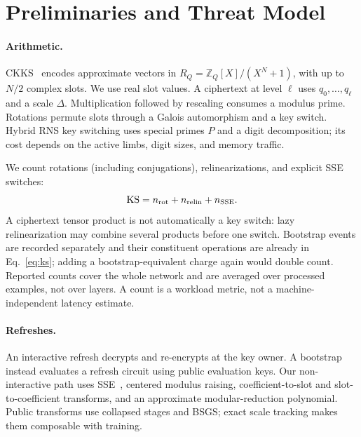 \section{Preliminaries and Threat Model}
\label{sec:prelim}
\paragraph{Arithmetic.}
CKKS~\cite{ckks2017} encodes approximate vectors in
$R_Q=\mathbb{Z}_Q[X]/(X^N+1)$, with up to $N/2$ complex slots. We use real slot values. A ciphertext at level $\ell$ uses $q_0,\ldots,q_\ell$ and a scale $\Delta$. Multiplication followed by rescaling consumes a modulus prime. Rotations permute slots through a Galois automorphism and a key switch. Hybrid RNS key switching uses special primes $P$ and a digit decomposition; its cost depends on the active limbs, digit sizes, and memory traffic.

We count rotations (including conjugations), relinearizations, and explicit SSE switches:
\begin{equation}
  \operatorname{KS} = n_{\mathrm{rot}}+n_{\mathrm{relin}}+n_{\mathrm{SSE}}.
  \label{eq:ks}
\end{equation}
A ciphertext tensor product is not automatically a key switch: lazy relinearization may combine several products before one switch. Bootstrap events are recorded separately and their constituent operations are already in Eq.~\eqref{eq:ks}; adding a bootstrap-equivalent charge again would double count. Reported counts cover the whole network and are averaged over processed examples, not over layers. A count is a workload metric, not a machine-independent latency estimate.

\paragraph{Refreshes.}
An interactive refresh decrypts and re-encrypts at the key owner. A bootstrap instead evaluates a refresh circuit using public evaluation keys. Our non-interactive path uses SSE~\cite{sse2022}, centered modulus raising, coefficient-to-slot and slot-to-coefficient transforms, and an approximate modular-reduction polynomial. Public transforms use collapsed stages and BSGS; exact scale tracking makes them composable with training.

